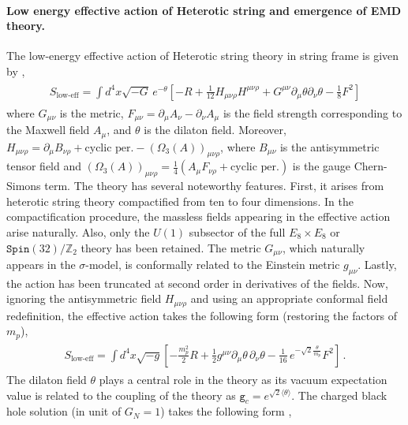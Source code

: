\paragraph*{Low energy effective action of Heterotic string and emergence of EMD theory.}
The low-energy effective action of Heterotic string theory in string frame is given by \cite{Metsaev:1987zx,Hassan:1991mq},
\begin{align}
    \begin{split}
        S_{\textrm{low-eff}}=\int d^4x \sqrt{-G}\,e^{-\theta}\left[-R+\frac{1}{12}H_{\mu\nu\rho}H^{\mu\nu \rho}+G^{\mu\nu}\partial_{\mu}\theta \partial_{\nu}\theta-\frac{1}{8}F^2\right]
    \end{split}
\end{align}
    where $G_{\mu\nu}$ is the metric, $F_{\mu\nu}=\partial_\mu A_{\nu}-\partial_{\nu}A_{\mu}$ is the field strength corresponding to the Maxwell field $A_{\mu}$, and $\theta$ is the dilaton field. Moreover, $H_{\mu\nu\rho}=\partial_{\mu} B_{\nu\rho}+\textrm{cyclic per.}-(\Omega_3(A))_{\mu\nu\rho}$, where $B_{\mu\nu}$ is the antisymmetric tensor field and $(\Omega_3(A))_{\mu\nu\rho}=\frac{1}{4}(A_{\mu}F_{\nu\rho}+\textrm{cyclic per.})$ is the gauge Chern-Simons term. The theory has several noteworthy features. First, it arises from heterotic string theory compactified from ten to four dimensions. In the compactification procedure, the massless fields appearing in the effective action arise naturally. Also, only the $U(1)$ subsector of the full $E_{8}\times E_{8}$ or $\texttt{Spin}(32)/\mathbb{Z}_2$ theory has been retained. The metric $G_{\mu\nu}$, which naturally appears in the $\sigma$-model, is conformally related to the Einstein metric $g_{\mu\nu}$. Lastly, the action has been truncated at second order in derivatives of the fields. Now, ignoring the antisymmetric field $H_{\mu\nu\rho}$ and using an appropriate conformal field redefinition, the effective action takes the following form (restoring the factors of $m_p$),
    \begin{align}
        \begin{split}
              S_{\textrm{low-eff}}=\int d^4 x \sqrt{-g}\left[-\frac{m_p^2}{2}R+\frac{1}{2}g^{\mu\nu}\partial_{\mu}\theta\,\partial_\nu \theta-\frac{1}{16}\,e^{-\sqrt{2}\frac{\theta}{m_p}}F^2\right]\,.
        \end{split}
    \end{align}
The dilaton field $\theta$ plays a central role in the theory as its vacuum expectation value is related to the coupling of the theory as $\texttt{g}_{c}=e^{\sqrt{2}\langle\theta\rangle}$. The charged black hole solution (in unit of $G_N=1$) takes the following form \cite{Garfinkle:1990qj,GIBBONS1988741},
